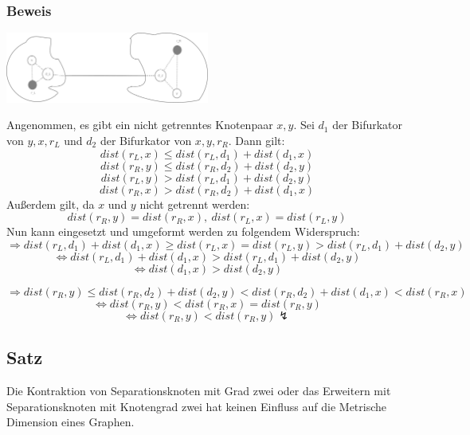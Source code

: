 \documentclass{article}
\begin{document}
\subsubsection{Beweis}
\begin{center}
  \includegraphics[width=190pt]{bew.pdf}
  \end{center}
  Angenommen, es gibt ein nicht getrenntes Knotenpaar $x,y$. Sei $d_1$ der Bifurkator von $y,x,r_L$ und $d_2$ der Bifurkator von $x,y,r_R$. Dann gilt: $$dist(r_L,x) \leq dist(r_L,d_1)+ dist(d_1,x)$$ $$dist(r_R,y) \leq dist(r_R,d_2)+ dist(d_2,y)$$ $$dist(r_L,y) > dist(r_L,d_1)+ dist(d_2,y)$$ $$dist(r_R,x) > dist(r_R,d_2)+ dist(d_1,x)$$
  Außerdem gilt, da $x$ und $y$ nicht getrennt werden:
   $$dist(r_R,y) =dist(r_R,x),\: dist(r_L,x) = dist(r_L,y)$$ Nun kann eingesetzt und umgeformt werden zu folgendem Widerspruch:
  $$\Rightarrow dist(r_L,d_1)+ dist(d_1,x) \geq dist(r_L,x) = dist(r_L,y)> dist(r_L,d_1)+ dist(d_2,y)$$
  $$\Leftrightarrow dist(r_L,d_1)+ dist(d_1,x) > dist(r_L,d_1)+ dist(d_2,y)$$
  $$\Leftrightarrow dist(d_1,x) >  dist(d_2,y)$$
  
  $$\Rightarrow dist(r_R,y) \leq dist(r_R,d_2)+ dist(d_2,y) < dist(r_R,d_2) + dist(d_1,x) < dist(r_R,x)$$
  $$\Leftrightarrow dist(r_R,y) < dist(r_R,x) = dist(r_R,y)$$
  $$\Leftrightarrow dist(r_R,y) < dist(r_R,y) \lightning $$  
  
\subsection{Satz}
Die Kontraktion von Separationsknoten mit Grad zwei oder das Erweitern mit Separationsknoten mit Knotengrad zwei hat keinen Einfluss auf die Metrische Dimension eines Graphen.
\end{document}
